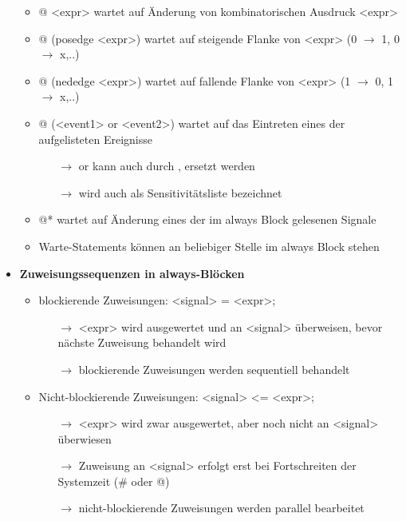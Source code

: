 \documentclass[11pt,a4paper]{article}
\begin{document}
\begin{itemize}
\begin{itemize}
	\item @ <expr> wartet auf Änderung von kombinatorischen Ausdruck <expr>
	\item @ (posedge <expr>) wartet auf steigende Flanke von <expr> (0 $\rightarrow$ 1, 0 $\rightarrow$ x,..)
	\item @ (nededge <expr>) wartet auf fallende Flanke von <expr> (1 $\rightarrow$ 0, 1 $\rightarrow$ x,..)
	\item @ (<event1> or <event2>) wartet auf das Eintreten eines der aufgelisteten Ereignisse
		\begin{itemize}
		\item[$\rightarrow$] or kann auch durch , ersetzt werden
		\item[$\rightarrow$] wird auch als Sensitivitätsliste bezeichnet
		\end{itemize}
	\item @* wartet auf Änderung eines der im always Block gelesenen Signale
	\item Warte-Statements können an beliebiger Stelle im always Block stehen
	
	\end{itemize}
	
\item \textbf{Zuweisungssequenzen in always-Blöcken}
	\begin{itemize}
	\item blockierende Zuweisungen: <signal> = <expr>;
		\begin{itemize}
		\item[$\rightarrow$] <expr> wird ausgewertet und an <signal> überweisen, bevor nächste Zuweisung behandelt wird
		\item[$\rightarrow$] blockierende Zuweisungen werden sequentiell behandelt
		\end{itemize}
	\item Nicht-blockierende Zuweisungen: <signal> <= <expr>;
		\begin{itemize}
		\item[$\rightarrow$] <expr> wird zwar ausgewertet, aber noch nicht an <signal> überwiesen
		\item[$\rightarrow$] Zuweisung an <signal> erfolgt erst bei Fortschreiten der Systemzeit (\# oder @)
		\item[$\rightarrow$] nicht-blockierende Zuweisungen werden parallel bearbeitet
		\end{itemize}
	\end{itemize}


\end{itemize}
\end{document}
